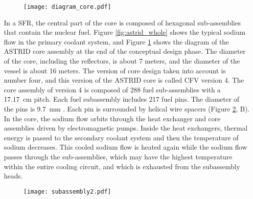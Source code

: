     \begin{figure}[htbp]
        \centerline{\texttt{[image: diagram\_core.pdf]}}
        \label{fig:diagram_core}
    \end{figure}
%
    In a SFR, the central part of the core is composed of hexagonal sub-assemblies that contain the nuclear fuel.
Figure \ref{fig:astrid_whole} shows the typical sodium flow in the primary coolant system,
and Figure \ref{fig:diagram_core} shows the diagram of the ASTRID core assembly at the end of the conceptual design phase.
The diameter of the core, including the reflectors, is about 7 meters, and the diameter of the vessel is about 16 meters.
The version of core design taken into account is
number four, and this version of the ASTRID core is called CFV version 4. The core assembly of version 4 is composed of 288 fuel sub-assemblies with a 17.17~cm pitch.
Each fuel subassembly includes 217 fuel pins. The diameter of the pins is 9.7~mm \parencite{Venard2017TheASTRIDcore}.
    Each pin is surrounded by helical wire spacers (Figure \ref{fig:subassembly}, B). In the core, the sodium flow orbits through the heat exchanger and core
assemblies driven by electromagnetic pumps. Inside the heat exchangers, thermal energy is passed to the secondary coolant system and then the temperature of sodium
decreases. This cooled sodium flow is heated again while the sodium flow passes through the sub-assemblies, which may have the highest temperature within
the entire cooling circuit, and which is exhausted from the subassembly heads.

    \begin{figure}[htbp]
        \centerline{\texttt{[image: subassembly2.pdf]}}
        \label{fig:subassembly}
    \end{figure}

